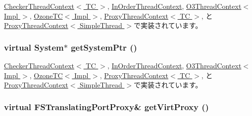 \hyperlink{classCheckerThreadContext_a0546f73d19db75274e9d0bc63c5f5908}{CheckerThreadContext$<$ TC $>$}, \hyperlink{classInOrderThreadContext_a0546f73d19db75274e9d0bc63c5f5908}{InOrderThreadContext}, \hyperlink{classO3ThreadContext_abe1122860803a2563325469d9d41f47a}{O3ThreadContext$<$ Impl $>$}, \hyperlink{classOzoneCPU_1_1OzoneTC_a62d5bde0391e38cd7463a35e98d5c742}{OzoneTC$<$ Impl $>$}, \hyperlink{classProxyThreadContext_a0546f73d19db75274e9d0bc63c5f5908}{ProxyThreadContext$<$ TC $>$}, と \hyperlink{classProxyThreadContext_a0546f73d19db75274e9d0bc63c5f5908}{ProxyThreadContext$<$ SimpleThread $>$}で実装されています。\hypertarget{classThreadContext_a4585cb7174e215741001b70fafe6662e}{
\subsubsection[{getSystemPtr}]{\setlength{\rightskip}{0pt plus 5cm}virtual {\bf System}$\ast$ getSystemPtr ()}}
\label{classThreadContext_a4585cb7174e215741001b70fafe6662e}


\hyperlink{classCheckerThreadContext_af7bdb56e0088b380302741ad9008f321}{CheckerThreadContext$<$ TC $>$}, \hyperlink{classInOrderThreadContext_af7bdb56e0088b380302741ad9008f321}{InOrderThreadContext}, \hyperlink{classO3ThreadContext_a8ff008929430425aaac3dc6f718be62c}{O3ThreadContext$<$ Impl $>$}, \hyperlink{classOzoneCPU_1_1OzoneTC_af7bdb56e0088b380302741ad9008f321}{OzoneTC$<$ Impl $>$}, \hyperlink{classProxyThreadContext_af7bdb56e0088b380302741ad9008f321}{ProxyThreadContext$<$ TC $>$}, と \hyperlink{classProxyThreadContext_af7bdb56e0088b380302741ad9008f321}{ProxyThreadContext$<$ SimpleThread $>$}で実装されています。\hypertarget{classThreadContext_a55e3a4b93d5f1ad641247f6d223191c6}{
\subsubsection[{getVirtProxy}]{\setlength{\rightskip}{0pt plus 5cm}virtual {\bf FSTranslatingPortProxy}\& getVirtProxy ()}}
\label{classThreadContext_a55e3a4b93d5f1ad641247f6d223191c6}


